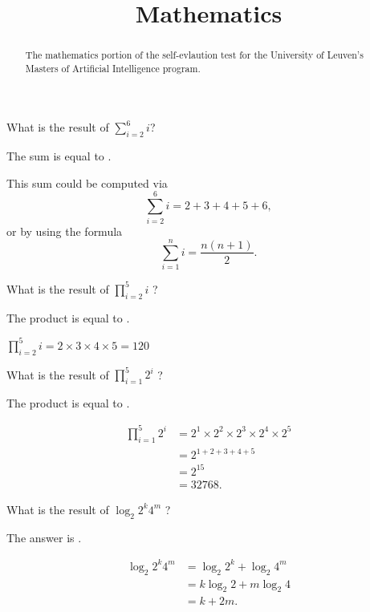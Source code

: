 \documentclass{ximera}
\title{Mathematics}
\begin{document}
\begin{abstract}
The mathematics portion of the self-evlaution test for the University
of Leuven's Masters of Artificial Intelligence program.
\end{abstract}
\maketitle

\begin{question}
What is the result of $\sum_{i=2}^6 i$?
\begin{solution}
The sum is equal to .
\end{solution}
This sum could be computed via
\[
\sum_{i=2}^6 i = 2 + 3 + 4 + 5 + 6,
\]
or by using the formula
\[
\sum_{i=1}^n i = \frac{n(n+1)}{2}.
\]
\end{question}

\begin{question}
What is  the result of $\prod_{i=2}^{5} i$ ? 
\begin{solution}
The product is equal to .
\end{solution}
$\prod_{i=2}^5 i = 2 \times 3 \times 4 \times 5 = 120$
\end{question}

\begin{question}
What is  the result of  $\prod_{i=1}^5 2^i$  ? 
\begin{solution}
The product is equal to .
\end{solution}
\begin{align*}
\prod_{i=1}^5 2^i &= 2^1 \times 2^2 \times 2^3 \times 2^4 \times 2^5 \\
&= 2^{1 + 2 + 3 + 4 + 5} \\
&= 2^{15} \\
&= 32768. 
\end{align*}
\end{question}

\begin{question}
What is  the result of  $\log_2 2^k 4^m$  ? 
\begin{solution}
The answer is .
\end{solution}
\begin{align*}
\log_2{2^k 4^m} &= \log_2{2^k} + \log_2{4^m} \\
&= k \log_2{2} + m \log_2{4} \\
&= k + 2m.
\end{align*}
\end{question}
\end{document}
